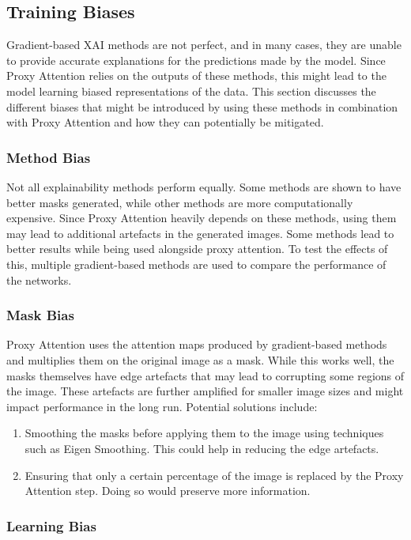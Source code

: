 \subsection{Training Biases}
Gradient-based XAI methods are not perfect, and in many cases, they are unable to provide accurate explanations for the predictions made by the model. Since Proxy Attention relies on the outputs of these methods, this might lead to the model learning biased representations of the data. This section discusses the different biases that might be introduced by using these methods in combination with Proxy Attention and how they can potentially be mitigated.

\subsubsection{Method Bias}
Not all explainability methods perform equally. Some methods are shown to have better masks generated, while other methods are more computationally expensive. Since Proxy Attention heavily depends on these methods, using them may lead to additional artefacts in the generated images. Some methods lead to better results while being used alongside proxy attention. To test the effects of this, multiple gradient-based methods are used to compare the performance of the networks.

\subsubsection{Mask Bias}
Proxy Attention uses the attention maps produced by gradient-based methods and multiplies them on the original image as a mask. While this works well, the masks themselves have edge artefacts that may lead to corrupting some regions of the image. These artefacts are further amplified for smaller image sizes and might impact performance in the long run.
Potential solutions include:

\begin{enumerate}
    \item Smoothing the masks before applying them to the image using techniques such as Eigen Smoothing. This could help in reducing the edge artefacts.
    \item Ensuring that only a certain percentage of the image is replaced by the Proxy Attention step. Doing so would preserve more information. 
\end{enumerate}

\subsubsection{Learning Bias}

